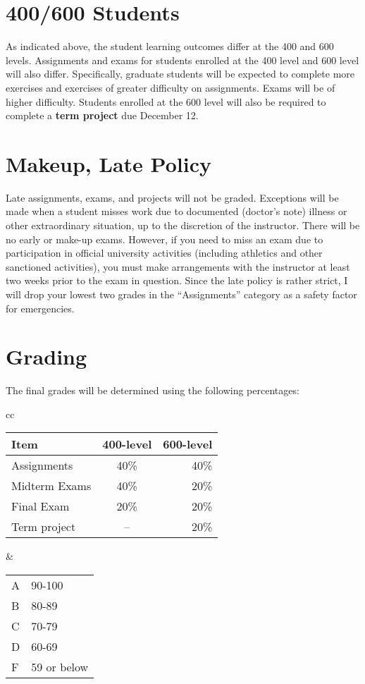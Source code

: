 \documentclass[11pt,onecolumn]{article}
\begin{document}
\section*{400/600 Students}
As indicated above, the student learning outcomes differ at the 400 and 600 levels. Assignments and exams for students enrolled at the 400 level and 600 level will also differ. Specifically, graduate students will be expected to complete more exercises and exercises of greater difficulty on assignments. Exams will be of higher difficulty. Students enrolled at the 600 level will also be required to complete a \textbf{term project} due December 12.

\section*{Makeup, Late Policy}
Late assignments, exams, and projects will not be graded. Exceptions will be made when a student misses work due to documented (doctor's note) illness or other extraordinary situation, up to the discretion of the instructor. There will be no early or make-up exams. However, if you need to miss an exam due to participation in official university activities (including athletics and other sanctioned activities), you must make arrangements with the instructor at least two weeks prior to the exam in question. Since the late policy is rather strict, I will drop your lowest two grades in the ``Assignments'' category as a safety factor for emergencies.

\section*{Grading}
The final grades will be determined using the following percentages:

\begin{center}
\begin{tabular}{cc}
\begin{tabular}{l|c|r}	%
Item&400-level& 600-level\\\hline\hline
  Assignments&40\% & 40\%\\
  Midterm Exams&40\%& 20\%\\
  Final Exam&20\%& 20\%\\
  Term project &-- &20\%\\
\end{tabular}
&
\begin{tabular}{ll}
A&90-100\\
B&80-89\\
C&70-79\\
D&60-69\\
F&59 or below
\end{tabular}
\end{tabular}
\end{center}
\end{document}
